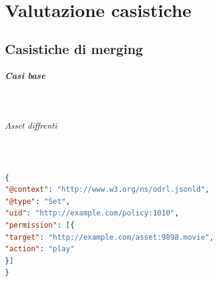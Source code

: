 \documentclass[12pt,a4paper,twoside]{book}
\begin{document}
\chapter{Valutazione casistiche}
\section{Casistiche di merging}
\paragraph{Casi base}\mbox{}\\
\subparagraph{Asset diffrenti}\mbox{}\\

\begin{lstlisting}[language=json,firstnumber=1,caption={La policy 1010 permette di riprodurre l'asset 9898.movie a chiunque},captionpos=b]
{
"@context": "http://www.w3.org/ns/odrl.jsonld",
"@type": "Set",
"uid": "http://example.com/policy:1010",
"permission": [{
"target": "http://example.com/asset:9898.movie",
"action": "play"
}]
}

\end{lstlisting}
\end{document}
